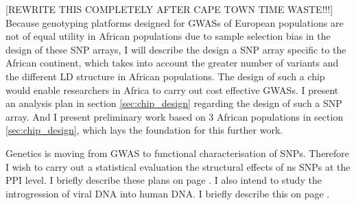 [REWRITE THIS COMPLETELY AFTER CAPE TOWN TIME WASTE!!!]
Because genotyping platforms designed for \glspl{GWAS} of European populations are not of equal utility in African populations due to sample selection bias in the design of these \gls{SNP} arrays, I will describe the design a \gls{SNP} array specific to the African continent, which takes into account the greater number of variants and the different \gls{LD} structure in African populations. The design of such a chip would enable researchers in Africa to carry out cost effective \glspl{GWAS}. I present an analysis plan in section \ref{sec:chip_design} regarding the design of such a \gls{SNP} array. And I present preliminary work based on 3 African populations in section \ref{sec:chip_design}, which lays the foundation for this further work.

Genetics is moving from \gls{GWAS} to functional characterisation of \glspl{SNP}. Therefore I wish to carry out a statistical evaluation the structural effects of \gls{ns} \glspl{SNP} at the \gls{PPI} level. I briefly describe these plans on page \pageref{chap:future}. I also intend to study the introgression of viral DNA into human DNA. I briefly describe this on page \pageref{chap:future}.




